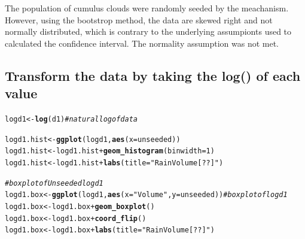 \documentclass{article}\usepackage[]{graphicx}\usepackage[]{color}
\makeatletter
\newcommand{\hlnum}[1]{\textcolor[rgb]{0.686,0.059,0.569}{#1}}%
\newcommand{\hlstr}[1]{\textcolor[rgb]{0.192,0.494,0.8}{#1}}%
\newcommand{\hlcom}[1]{\textcolor[rgb]{0.678,0.584,0.686}{\textit{#1}}}%
\newcommand{\hlopt}[1]{\textcolor[rgb]{0,0,0}{#1}}%
\newcommand{\hlstd}[1]{\textcolor[rgb]{0.345,0.345,0.345}{#1}}%
\newcommand{\hlkwb}[1]{\textcolor[rgb]{0.69,0.353,0.396}{#1}}%
\newcommand{\hlkwc}[1]{\textcolor[rgb]{0.333,0.667,0.333}{#1}}%
\newcommand{\hlkwd}[1]{\textcolor[rgb]{0.737,0.353,0.396}{\textbf{#1}}}%
\newenvironment{kframe}{%
 \def\at@end@of@kframe{}%
 \ifinner\ifhmode%
  \def\at@end@of@kframe{\end{minipage}}%
  \begin{minipage}{\columnwidth}%
 \fi\fi%
 \def\FrameCommand##1{\hskip\@totalleftmargin \hskip-\fboxsep
 \colorbox{shadecolor}{##1}\hskip-\fboxsep
     \hskip-\linewidth \hskip-\@totalleftmargin \hskip\columnwidth}%
 \MakeFramed {\advance\hsize-\width
   \@totalleftmargin\z@ \linewidth\hsize
   \@setminipage}}%
 {\par\unskip\endMakeFramed%
 \at@end@of@kframe}
\newenvironment{knitrout}{}{} %
\makeatother
\begin{document}
The population of cumulus clouds were randomly seeded by the meachanism.
However, using the bootstrop method, the data are skewed right and
not normally distributed, which is contrary to the underlying assumpionts
used to calculated the confidence interval.  The normality assumption was not met.

\subsection{Transform the data by taking the log() of each value}

\begin{knitrout}
\color{fgcolor}\begin{kframe}
\begin{alltt}
\hlstd{logd1} \hlkwb{<-} \hlkwd{log}\hlstd{(d1)} \hlcom{# natural log of data}

\hlstd{logd1.hist} \hlkwb{<-} \hlkwd{ggplot}\hlstd{(logd1,} \hlkwd{aes}\hlstd{(}\hlkwc{x} \hlstd{= unseeded))}
\hlstd{logd1.hist} \hlkwb{<-} \hlstd{logd1.hist} \hlopt{+} \hlkwd{geom_histogram}\hlstd{(}\hlkwc{binwidth} \hlstd{=} \hlnum{1}\hlstd{)}
\hlstd{logd1.hist} \hlkwb{<-} \hlstd{logd1.hist} \hlopt{+} \hlkwd{labs}\hlstd{(}\hlkwc{title} \hlstd{=} \hlstr{"Rain Volume [??]"}\hlstd{)}

\hlcom{# boxplot of Unseeded logd1}
\hlstd{logd1.box} \hlkwb{<-} \hlkwd{ggplot}\hlstd{(logd1,} \hlkwd{aes}\hlstd{(}\hlkwc{x} \hlstd{=} \hlstr{"Volume"}\hlstd{,} \hlkwc{y} \hlstd{= unseeded))} \hlcom{# boxplot of logd1}
\hlstd{logd1.box} \hlkwb{<-} \hlstd{logd1.box} \hlopt{+} \hlkwd{geom_boxplot}\hlstd{()}
\hlstd{logd1.box} \hlkwb{<-} \hlstd{logd1.box} \hlopt{+} \hlkwd{coord_flip}\hlstd{()}
\hlstd{logd1.box} \hlkwb{<-} \hlstd{logd1.box} \hlopt{+} \hlkwd{labs}\hlstd{(}\hlkwc{title} \hlstd{=} \hlstr{"Rain Volume [??]"}\hlstd{)}


\end{alltt}
\end{kframe}
\end{knitrout}
\end{document}

